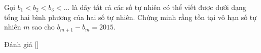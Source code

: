 \ifshowproblem
\begin{problem}\label{problem:IRN-2015-TST1-P3}
    Gọi \( b_1 < b_2 < b_3 < \dots \) là dãy tất cả các số tự nhiên có thể viết được dưới dạng tổng hai bình phương của hai số tự nhiên.
    Chứng minh rằng tồn tại vô hạn số tự nhiên \( m \) sao cho \( b_{m+1} - b_m = 2015 \).
\end{problem}
\fi

\ifshowinfo
Đánh giá [\textbf{}]\footnotemark
{}
\fi